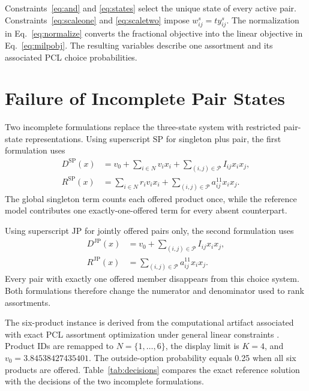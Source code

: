 \documentclass[10pt]{article}
\begin{document}
Constraints~\eqref{eq:and} and \eqref{eq:states} select the unique state of every active pair. Constraints~\eqref{eq:scaleone} and \eqref{eq:scaletwo} impose $w_{ij}^s=t y_{ij}^s$. The normalization in Eq.~\eqref{eq:normalize} converts the fractional objective into the linear objective in Eq.~\eqref{eq:milpobj}. The resulting variables describe one assortment and its associated PCL choice probabilities.

\section{Failure of Incomplete Pair States}

Two incomplete formulations replace the three-state system with restricted pair-state representations. Using superscript $\mathrm{SP}$ for singleton plus pair, the first formulation uses
\begin{align}
D^{\mathrm{SP}}(x)
&=
v_0+
\sum_{i\in N}v_i x_i+
\sum_{(i,j)\in\mathcal P}I_{ij}x_ix_j,
\label{eq:spDenom}\\
R^{\mathrm{SP}}(x)
&=
\sum_{i\in N}r_iv_i x_i+
\sum_{(i,j)\in\mathcal P}a_{ij}^{11}x_ix_j.
\label{eq:spNumer}
\end{align}
The global singleton term counts each offered product once, while the reference model contributes one exactly-one-offered term for every absent counterpart.

Using superscript $\mathrm{JP}$ for jointly offered pairs only, the second formulation uses
\begin{align}
D^{\mathrm{JP}}(x)
&=
v_0+
\sum_{(i,j)\in\mathcal P}I_{ij}x_ix_j,
\label{eq:jpDenom}\\
R^{\mathrm{JP}}(x)
&=
\sum_{(i,j)\in\mathcal P}a_{ij}^{11}x_ix_j.
\label{eq:jpNumer}
\end{align}
Every pair with exactly one offered member disappears from this choice system. Both formulations therefore change the numerator and denominator used to rank assortments.

The six-product instance is derived from the computational artifact associated with exact PCL assortment optimization under general linear constraints \citep{feng2026,artifact}. Product IDs are remapped to $N=\{1,\ldots,6\}$, the display limit is $K=4$, and $v_0=3.84538427435401$. The outside-option probability equals 0.25 when all six products are offered. Table~\ref{tab:decisions} compares the exact reference solution with the decisions of the two incomplete formulations.
\end{document}
